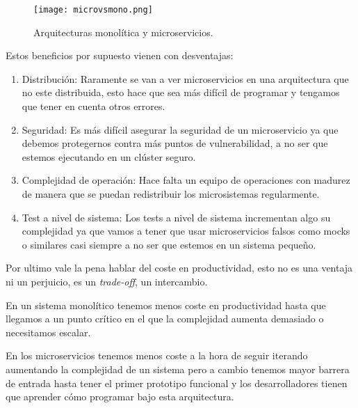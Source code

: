 \begin{figure}
	\centering
	\texttt{[image: microvsmono.png]}
	\caption{Arquitecturas monolítica y microservicios.\cite{fow14}}\label{fig:microvsmono.png}
\end{figure}

Estos beneficios por supuesto vienen con desventajas:

\begin{enumerate}
\item Distribución: Raramente se van a ver microservicios en una arquitectura que no este distribuida, esto hace que sea más difícil de programar y tengamos que tener en cuenta otros errores.
\item Seguridad: Es más difícil asegurar la seguridad de un microservicio ya que debemos protegernos contra más puntos de vulnerabilidad, a no ser que estemos ejecutando en un clúster seguro.
\item Complejidad de operación: Hace falta un equipo de operaciones con madurez de manera que se puedan redistribuir los microsistemas regularmente.
\item Test a nivel de sistema: Los tests a nivel de sistema incrementan algo su complejidad ya que vamos a tener que usar microservicios falsos como mocks o similares casi siempre a no ser que estemos en un sistema pequeño.
\end{enumerate}

Por ultimo vale la pena hablar del coste en productividad, esto no es una ventaja ni un perjuicio, es un \textit{trade-off}, un intercambio.

En un sistema monolítico tenemos menos coste en productividad hasta que llegamos a un punto crítico en el que la complejidad aumenta demasiado o necesitamos escalar.

En los microservicios tenemos menos coste a la hora de seguir iterando aumentando la complejidad de un sistema pero a cambio tenemos mayor barrera de entrada hasta tener el primer prototipo funcional y los desarrolladores tienen que aprender cómo programar bajo esta arquitectura.
